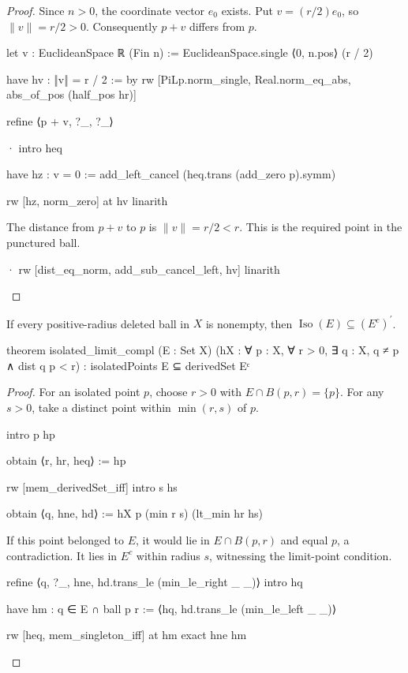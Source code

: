 \begin{proof}
  Since $n>0$, the coordinate vector $e_0$ exists.
  Put $v=(r/2)e_0$, so $\|v\|=r/2>0$.
  Consequently $p+v$ differs from $p$.

  \begin{lean}
    let v : EuclideanSpace ℝ (Fin n) := EuclideanSpace.single ⟨0, n.pos⟩ (r / 2)

    have hv : ‖v‖ = r / 2 := by
      rw [PiLp.norm_single, Real.norm_eq_abs, abs_of_pos (half_pos hr)]

    refine ⟨p + v, ?_, ?_⟩

    · intro heq

      have hz : v = 0 := add_left_cancel (heq.trans (add_zero p).symm)

      rw [hz, norm_zero] at hv
      linarith
  \end{lean}

  The distance from $p+v$ to $p$ is $\|v\|=r/2<r$.
  This is the required point in the punctured ball.

  \begin{lean}
    · rw [dist_eq_norm, add_sub_cancel_left, hv]
      linarith
  \end{lean}
\end{proof}

\begin{lemma}
  \label{ma:lem:isolated-limit-compl}
  If every positive-radius deleted ball in $X$ is nonempty, then
  $\operatorname{Iso}(E)\subseteq(E^{c})^{\prime}$.

  \begin{lean}
    theorem isolated_limit_compl (E : Set X)
        (hX : ∀ p : X, ∀ r > 0, ∃ q : X, q ≠ p ∧ dist q p < r) :
        isolatedPoints E ⊆ derivedSet Eᶜ
  \end{lean}
\end{lemma}

\begin{proof}
  For an isolated point $p$, choose $r>0$ with $E\cap B(p,r)=\{p\}$.
  For any $s>0$, take a distinct point within $\min(r,s)$ of $p$.

  \begin{lean}
    intro p hp

    obtain ⟨r, hr, heq⟩ := hp

    rw [mem_derivedSet_iff]
    intro s hs

    obtain ⟨q, hne, hd⟩ := hX p (min r s) (lt_min hr hs)
  \end{lean}

  If this point belonged to $E$, it would lie in $E\cap B(p,r)$ and equal $p$, a contradiction.
  It lies in $E^c$ within radius $s$, witnessing the limit-point condition.

  \begin{lean}
    refine ⟨q, ?_, hne, hd.trans_le (min_le_right _ _)⟩
    intro hq

    have hm : q ∈ E ∩ ball p r := ⟨hq, hd.trans_le (min_le_left _ _)⟩

    rw [heq, mem_singleton_iff] at hm
    exact hne hm
  \end{lean}
\end{proof}

